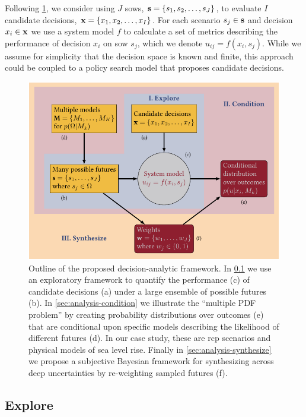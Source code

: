 \documentclass[11pt]{article}
\begin{document}
Following \cref{fig:flowchart}, we consider using $J$ \glspl{sow}, $\vb{s} = \qty{s_1, s_2, \ldots, s_J}$, to evaluate $I$ candidate decisions, $\vb{x} = \qty{x_1, x_2, \ldots, x_I}$.
For each scenario $s_j \in \vb{s}$ and decision $x_i \in \vb{x}$ we use a system model $f$ to calculate a set of metrics describing the performance of decision $x_i$ on \gls{sow} $s_j$, which we denote $u_{ij} = f(x_i, s_j)$.
While we assume for simplicity that the decision space is known and finite, this approach could be coupled to a policy search model that proposes candidate decisions.

\begin{figure}
    \centering
    \includegraphics[width=\textwidth]{bayes-rdm.pdf}
    \caption{
        Outline of the proposed decision-analytic framework.
        In \cref{sec:analysis-explore} we use an exploratory framework to quantify the performance (c) of candidate decisions (a) under a large ensemble of possible futures (b).
        In \cref{sec:analysis-condition} we illustrate the ``multiple PDF problem'' by creating probability distributions over outcomes (e) that are conditional upon specific models describing the likelihood of different futures (d).
        In our case study, these are \gls{rcp} scenarios and physical models of sea level rise.
        Finally in \cref{sec:analysis-synthesize} we propose a subjective Bayesian framework for synthesizing across deep uncertainties by re-weighting sampled futures (f).
    }\label{fig:flowchart}
\end{figure}

\subsection{Explore}\label{sec:analysis-explore}
\end{document}
